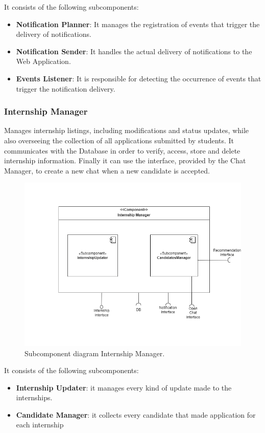 It consists of the following subcomponents:
\begin{itemize}
    \item  \textbf{Notification Planner}: It manages the registration of events that trigger the delivery of notifications.
    \item  \textbf{Notification Sender}: It handles the actual delivery of notifications to the Web Application.
    \item  \textbf{Events Listener}: It is responsible for detecting the occurrence of events that trigger the notification delivery.
    \end{itemize}
 \clearpage %
\subsubsection{Internship Manager} Manages internship listings, including modifications and status updates, while also overseeing the collection of all applications submitted by students.  It communicates with the Database in order to verify, access, store and delete internship information. Finally it can use the interface, provided by the Chat Manager, to create a new chat when a new candidate is accepted.
    \begin{figure}[H]
    \centering
    \includegraphics[width=\linewidth]{DD/Images/Comp&Sub/InternshipManager.png}
    \caption{Subcomponent diagram Internship Manager.}
    \label{fig:internship_manager}
    \end{figure}
    
It consists of the following subcomponents:
\begin{itemize}
    \item  \textbf{Internship Updater}: it manages every kind of update made to the internships.
    \item  \textbf{Candidate Manager}: it collects every candidate that made application for each internship
    \end{itemize}

